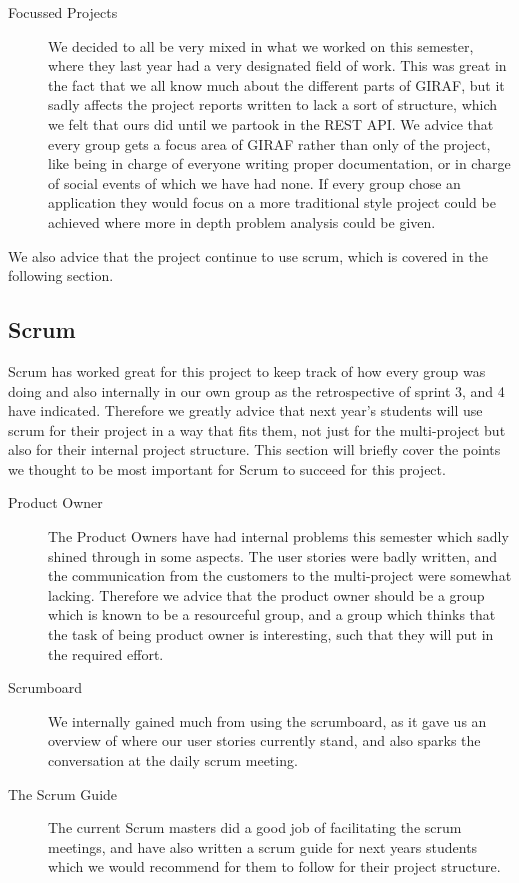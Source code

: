 \begin{description}
	\item[Focussed Projects] We decided to all be very mixed in what we worked on this semester, where they last year had a very designated field of work.
	This was great in the fact that we all know much about the different parts of GIRAF, but it sadly affects the project reports written to lack a sort of structure, which we felt that ours did until we partook in the REST API.
	We advice that every group gets a focus area of GIRAF rather than only of the project, like being in charge of everyone writing proper documentation, or in charge of social events of which we have had none.
	If every group chose an application they would focus on a more traditional style project could be achieved where more in depth problem analysis could be given.
\end{description}

We also advice that the project continue to use scrum, which is covered in the following section.

\subsection{Scrum}
Scrum has worked great for this project to keep track of how every group was doing and also internally in our own group as the retrospective of sprint 3, and 4 have indicated.
Therefore we greatly advice that next year's students will use scrum for their project in a way that fits them, not just for the multi-project but also for their internal project structure.
This section will briefly cover the points we thought to be most important for Scrum to succeed for this project.

\begin{description}
	\item[Product Owner] The Product Owners have had internal problems this semester which sadly shined through in some aspects.
	The user stories were badly written, and the communication from the customers to the multi-project were somewhat lacking.
	Therefore we advice that the product owner should be a group which is known to be a resourceful group, and a group which thinks that the task of being product owner is interesting, such that they will put in the required effort.

	\item[Scrumboard] We internally gained much from using the scrumboard, as it gave us an overview of where our user stories currently stand, and also sparks the conversation at the daily scrum meeting.

	\item[The Scrum Guide] The current Scrum masters did a good job of facilitating the scrum meetings, and have also written a scrum guide for next years students which we would recommend for them to follow for their project structure.
\end{description}